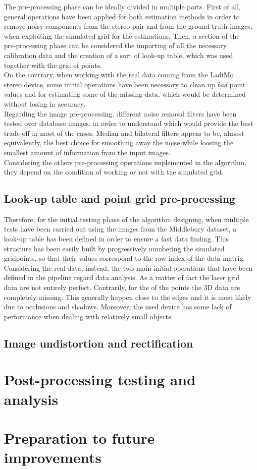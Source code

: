 The pre-processing phase can be ideally divided in multiple parts.
First of all, general operations have been applied for both estimation methods in order to remove noisy components from the stereo pair and from the ground truth images, when exploiting the simulated grid for the estimations.
Then, a section of the pre-processing phase can be considered the importing of all the necessary calibration data and the creation of a sort of look-up table, which was used together with the grid of points.\\
On the contrary, when working with the real data coming from the LadiMo stereo device, some initial operations have been necessary to clean up \textit{bad} point values and for estimating some of the missing data, which would be determined without losing in accuracy. \\
Regarding the image pre-processing, different noise removal filters have been tested over database images, in order to understand which would provide the best trade-off in most of the cases. 
Median and bilateral filters appear to be, almost equivalently, the best choice for smoothing away the noise while loosing the smallest amount of information from the input images. \\
Considering the others pre-processing operations implemented in the algorithm, they depend on the condition of working or not with the simulated grid.

\subsection{Look-up table and point grid pre-processing}
\label{subsection:grid-preprocessing}

Therefore, for the initial testing phase of the algorithm designing, when multiple tests have been carried out using the images from the Middlebury dataset, a look-up table has been defined in order to ensure a fast data finding. 
This structure has been easily built by progressively numbering the simulated gridpoints, so that their values correspond to the row index of the data matrix. \\
Considering the real data, instead, the two main initial operations that have been defined in the pipeline regard data analysis. 
As a matter of fact the laser grid data are not entirely perfect.
Contrarily, for the of the points the 3D data are completely missing.
This generally happen close to the edges and it is most likely due to occlusions and shadows.
Moreover, the used device has some lack of performance when dealing with relatively small objects. 

\subsection{Image undistortion and rectification}
\label{subsection:img-undist-and-rectific}

\section{Post-processing testing and analysis}
\label{section:post-processing-impl}

\section{Preparation to future improvements}
\label{section:intro-future-improv}
